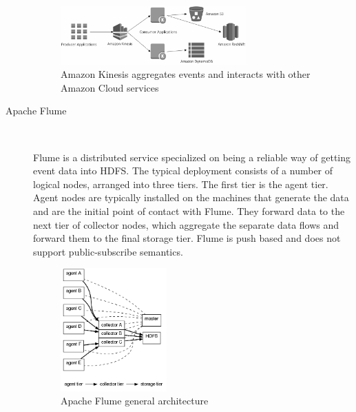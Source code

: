 \begin{description}
{   \begin{figure}[H]
     \centering
     \includegraphics[width=0.7\textwidth]{images/amazon-kinesis.png}
         \caption{Amazon Kinesis aggregates events and interacts with other
             Amazon Cloud services \cite{amazonKinesis}}
        \label{fig:amazon-kinesis}
    \end{figure}
    }
    \item [Apache Flume] \hfill \\
    {Flume is a distributed service specialized on being a reliable way of
    getting event data into HDFS. The typical deployment consists
    of a number of logical nodes, arranged into three tiers. The first tier
    is the agent tier. Agent nodes are typically installed on the machines
    that generate the data and are the initial point of contact with Flume.
    They forward data to the next tier of collector nodes, which aggregate the
    separate data flows and forward them to the final storage tier. Flume is
    push based and does not support public-subscribe semantics. \cite{apacheflumeDoc}
    \begin{figure}[H]
     \centering
     \includegraphics[width=0.4\textwidth]{images/flume-architecture.png}
     \caption{Apache Flume general architecture \cite{apacheflumeDoc}} 
        \label{fig:flume-architecture}
    \end{figure}

    }
\end{description}
